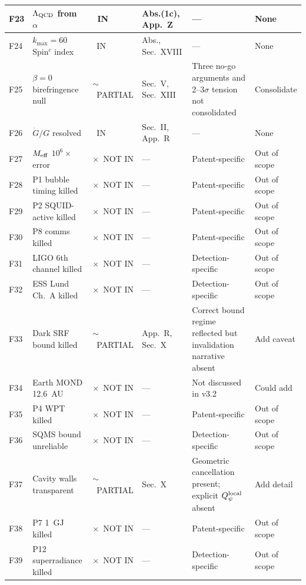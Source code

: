 \documentclass[11pt,a4paper]{article}
\newcommand{\vin}{\textcolor{statusIN}{\checkmark~IN}}
\newcommand{\vpartial}{\textcolor{statusPARTIAL}{$\sim$~PARTIAL}}
\newcommand{\vnot}{\textcolor{statusNOT}{$\times$~NOT IN}}
\begin{document}
{\begin{longtable}{|p{0.5cm}|p{4.8cm}|p{1.6cm}|p{2.5cm}|p{4.5cm}|p{1.8cm}|}
\hline
\rowcolor{major!8}
F23 & $\Lambda_{\rm QCD}$ from $\alpha$ & \vin & Abs.(1c), App.~Z & --- & None \\
\hline
\rowcolor{major!8}
F24 & $k_{\max} = 60$ Spin$^c$ index & \vin & Abs., Sec.~XVIII & --- & None \\
\hline
\rowcolor{major!8}
F25 & $\beta = 0$ birefringence null & \vpartial & Sec.~V, Sec.~XIII & Three no-go arguments and 2--3$\sigma$ tension not consolidated & Consolidate \\
\hline

\rowcolor{important!8}
F26 & $\dot{G}/G$ resolved & \vin & Sec.~II, App.~R & --- & None \\
\hline
\rowcolor{important!8}
F27 & $M_{\rm eff}$ $10^6\times$ error & \vnot & --- & Patent-specific & Out of scope \\
\hline
\rowcolor{important!8}
F28 & P1 bubble timing killed & \vnot & --- & Patent-specific & Out of scope \\
\hline
\rowcolor{important!8}
F29 & P2 SQUID-active killed & \vnot & --- & Patent-specific & Out of scope \\
\hline
\rowcolor{important!8}
F30 & P8 comms killed & \vnot & --- & Patent-specific & Out of scope \\
\hline
\rowcolor{important!8}
F31 & LIGO 6th channel killed & \vnot & --- & Detection-specific & Out of scope \\
\hline
\rowcolor{important!8}
F32 & ESS Lund Ch.~A killed & \vnot & --- & Detection-specific & Out of scope \\
\hline
\rowcolor{important!8}
F33 & Dark SRF bound killed & \vpartial & App.~R, Sec.~X & Correct bound regime reflected but invalidation narrative absent & Add caveat \\
\hline
\rowcolor{important!8}
F34 & Earth MOND 12.6~AU & \vnot & --- & Not discussed in v3.2 & Could add \\
\hline
\rowcolor{important!8}
F35 & P4 WPT killed & \vnot & --- & Patent-specific & Out of scope \\
\hline
\rowcolor{important!8}
F36 & SQMS bound unreliable & \vnot & --- & Detection-specific & Out of scope \\
\hline
\rowcolor{important!8}
F37 & Cavity walls transparent & \vpartial & Sec.~X & Geometric cancellation present; explicit $Q_\psi^{\rm local}$ absent & Add detail \\
\hline
\rowcolor{important!8}
F38 & P7 1~GJ killed & \vnot & --- & Patent-specific & Out of scope \\
\hline
\rowcolor{important!8}
F39 & P12 superradiance killed & \vnot & --- & Detection-specific & Out of scope \\
\hline


\end{longtable}}
\end{document}
